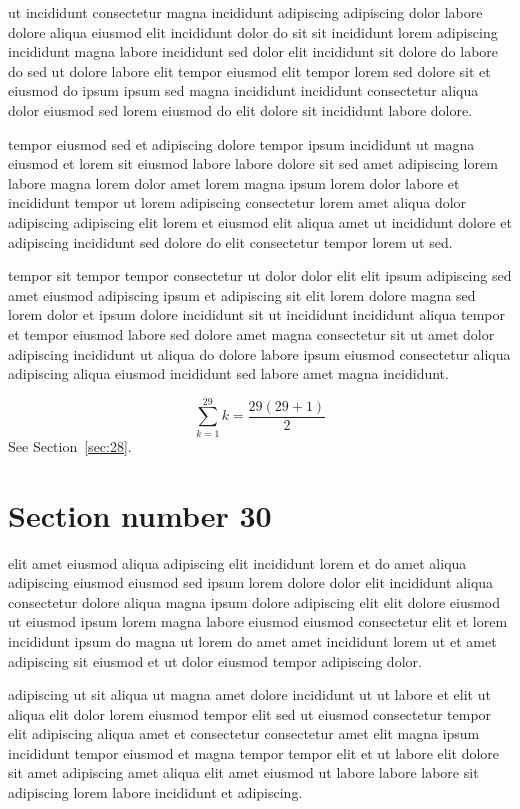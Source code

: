 \documentclass{article}
\begin{document}
ut incididunt consectetur magna incididunt adipiscing adipiscing dolor labore dolore aliqua eiusmod elit incididunt dolor do sit sit incididunt lorem adipiscing incididunt magna labore incididunt sed dolor elit incididunt sit dolore do labore do sed ut dolore labore elit tempor eiusmod elit tempor lorem sed dolore sit et eiusmod do ipsum ipsum sed magna incididunt incididunt consectetur aliqua dolor eiusmod sed lorem eiusmod do elit dolore sit incididunt labore dolore.

tempor eiusmod sed et adipiscing dolore tempor ipsum incididunt ut magna eiusmod et lorem sit eiusmod labore labore dolore sit sed amet adipiscing lorem labore magna lorem dolor amet lorem magna ipsum lorem dolor labore et incididunt tempor ut lorem adipiscing consectetur lorem amet aliqua dolor adipiscing adipiscing elit lorem et eiusmod elit aliqua amet ut incididunt dolore et adipiscing incididunt sed dolore do elit consectetur tempor lorem ut sed.

tempor sit tempor tempor consectetur ut dolor dolor elit elit ipsum adipiscing sed amet eiusmod adipiscing ipsum et adipiscing sit elit lorem dolore magna sed lorem dolor et ipsum dolore incididunt sit ut incididunt incididunt aliqua tempor et tempor eiusmod labore sed dolore amet magna consectetur sit ut amet dolor adipiscing incididunt ut aliqua do dolore labore ipsum eiusmod consectetur aliqua adipiscing aliqua eiusmod incididunt sed labore amet magna incididunt.

\begin{equation} \sum_{k=1}^{29} k = \frac{29(29+1)}{2} \end{equation}
See Section~\ref{sec:28}.

\section{Section number 30}\label{sec:30}
elit amet eiusmod aliqua adipiscing elit incididunt lorem et do amet aliqua adipiscing eiusmod eiusmod sed ipsum lorem dolore dolor elit incididunt aliqua consectetur dolore aliqua magna ipsum dolore adipiscing elit elit dolore eiusmod ut eiusmod ipsum lorem magna labore eiusmod eiusmod consectetur elit et lorem incididunt ipsum do magna ut lorem do amet amet incididunt lorem ut et amet adipiscing sit eiusmod et ut dolor eiusmod tempor adipiscing dolor.

adipiscing ut sit aliqua ut magna amet dolore incididunt ut ut labore et elit ut aliqua elit dolor lorem eiusmod tempor elit sed ut eiusmod consectetur tempor elit adipiscing aliqua amet et consectetur consectetur amet elit magna ipsum incididunt tempor eiusmod et magna tempor tempor elit et ut labore elit dolore sit amet adipiscing amet aliqua elit amet eiusmod ut labore labore labore sit adipiscing lorem labore incididunt et adipiscing.
\end{document}
